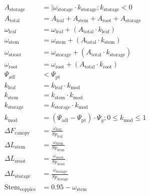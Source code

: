 \documentclass[24pt]{report}
\begin{document}
\begin{align}
A_{\text{storage}} &= |\omega_{\text{storage}} \cdot k_{\text{storage}} ;  k_{\text{storage}}<0 \label{eqn:Astroot} \\
A_{\text{total}} &= A_{\text{leaf}} + A_{\text{stem}} + A_{\text{root}} + A_{\text{storage}}  \label{eqn:Atotal} \\
\omega_{\text{leaf}} &= \omega_{\text{leaf}} + (A_{\text{total}} \cdot k_{\text{leaf}}) \label{eqn:omegaleaf} \\
\omega_{\text{stem}} &= \omega_{\text{stem}} + (A_{\text{total}} \cdot k_{\text{stem}}) \label{eqn:omegastem} \\
 \omega_{\text{stroot}} &= \omega_{\text{storage}} + (A_{\text{total}} \cdot k_{\text{storage}})  \\
 \omega_{\text{root}} &= \omega_{\text{root}} + (A_{\text{total}} \cdot k_{\text{root}}) \label{eqn:omegaroot} \\
 \Psi_{\text{adl}} &< \Psi_{\text{pt}}  \\
 k_{\text{leaf}} &= k_{\text{leaf}} \cdot k_{\text{mod}} \\
 k_{\text{stem}} &= k_{\text{stem}} \cdot k_{\text{mod}} \\ 
 k_{\text{storage}} &= k_{\text{storage}} \cdot k_{\text{mod}}  \\ 
 k_{\text{mod}} &= (\Psi_{\text{adl}} - \Psi_{\text{pt}}) \cdot \Psi_g ; 0 \leq k_{\text{mod}} \leq 1 \label{eqn:kmod} \\
 \Delta F_{\text{canopy}} &= \frac{\omega_{\text{leaf}}}{Sp_{\text{leaf}}} \label{eqn:DeltaFcanopy} \\
 \Delta L_{\text{stem}} &= \frac{\omega_{\text{stem}}}{Sp_{\text{stem}}} \label{eqn:DeltaLstem} \\
 \Delta L_{\text{sroot}} &= \frac{\omega_{\text{sroot}}}{Sp_{\text{sroot}}} \label{eqn:DeltaLsroot} \\
 \Delta L_{\text{storage}} &= \frac{\omega_{\text{storage}}}{Sp_{\text{storage}}}\\
\text{Stem}_{\text{coppice}}&=0.95 - \omega_{\text{stem}}
\end{align}
\end{document}
